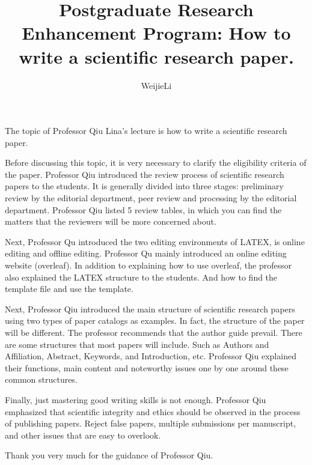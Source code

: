 \documentclass[prodmode,acmtap]{acmlarge}
\title{Postgraduate Research Enhancement Program: How to write a scientific research paper.}
\author{WeijieLi \affil{South China Normal University}}
\begin{document}
\maketitle

The topic of Professor Qiu Lina's lecture is how to write a scientific research paper.

Before discussing this topic, it is very necessary to clarify the eligibility criteria of the paper. Professor Qiu introduced the review process of scientific research papers to the students. It is generally divided into three stages: preliminary review by the editorial department, peer review and processing by the editorial department. Professor Qiu listed 5 review tables, in which you can find the matters that the reviewers will be more concerned about.

Next, Professor Qu introduced the two editing environments of LATEX, is online editing and offline editing. Professor Qu mainly introduced an online editing website (overleaf). In addition to explaining how to use overleaf, the professor also explained the LATEX structure to the students. And how to find the template file and use the template.

Next, Professor Qiu introduced the main structure of scientific research papers using two types of paper catalogs as examples. In fact, the structure of the paper will be different. The professor recommends that the author guide prevail. There are some structures that most papers will include. Such as Authors and Affiliation, Abstract, Keywords, and Introduction, etc. Professor Qiu explained their functions, main content and noteworthy issues one by one around these common structures.

Finally, just mastering good writing skills is not enough. Professor Qiu emphasized that scientific integrity and ethics should be observed in the process of publishing papers. Reject false papers, multiple submissions per manuscript, and other issues that are easy to overlook.

Thank you very much for the guidance of Professor Qiu.
\end{document}
